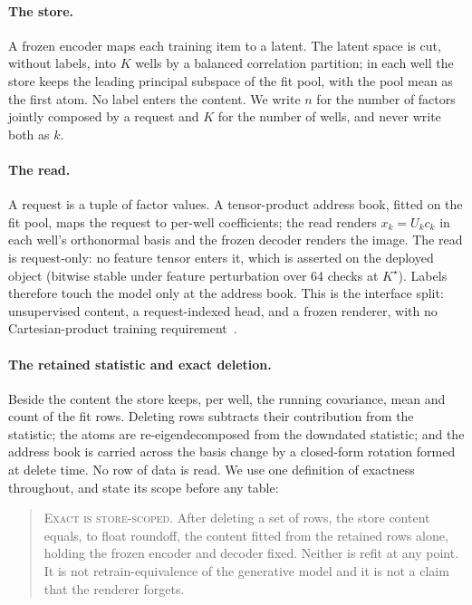 \documentclass{article} %
\newcommand{\Kstar}{\ensuremath{K^{\star}}}
\begin{document}


\paragraph{The store.} A frozen encoder maps each training item to a latent. The latent
space is cut, without labels, into $K$ wells by a balanced correlation partition; in each well
the store keeps the leading principal subspace of the fit pool, with the pool mean as the
first atom. No label enters the content. We write $n$ for the number of factors jointly
composed by a request and $K$ for the number of wells, and never write both as $k$.

\paragraph{The read.} A request is a tuple of factor values. A tensor-product address book,
fitted on the fit pool, maps the request to per-well coefficients; the read renders
$x_k=U_k c_k$ in each well's orthonormal basis and the frozen decoder renders the image. The
read is request-only: no feature tensor enters it, which is asserted on the deployed object
(bitwise stable under feature perturbation over 64 checks at $\Kstar$).
Labels therefore touch the model only at the address book. This is the interface split:
unsupervised content, a request-indexed head, and a frozen renderer, with no Cartesian-product
training requirement~\citep{wiedemer2023compositional,lachapelle2023additive,montero2022lost}.

\paragraph{The retained statistic and exact deletion.} Beside the content the store keeps, per
well, the running covariance, mean and count of the fit rows. Deleting rows subtracts their
contribution from the statistic; the atoms are re-eigendecomposed from the downdated
statistic; and the address book is carried across the basis change by a closed-form rotation
formed at delete time. No row of data is read. We use one definition of exactness throughout,
and state its scope before any table:

\begin{quote}\small
\textsc{Exact is store-scoped.} After deleting a set of rows, the store content equals, to
float roundoff, the content fitted from the retained rows alone, holding the frozen encoder and
decoder fixed. Neither is refit at any point. It is not retrain-equivalence of the generative
model and it is not a claim that the renderer forgets.
\end{quote}
\end{document}
